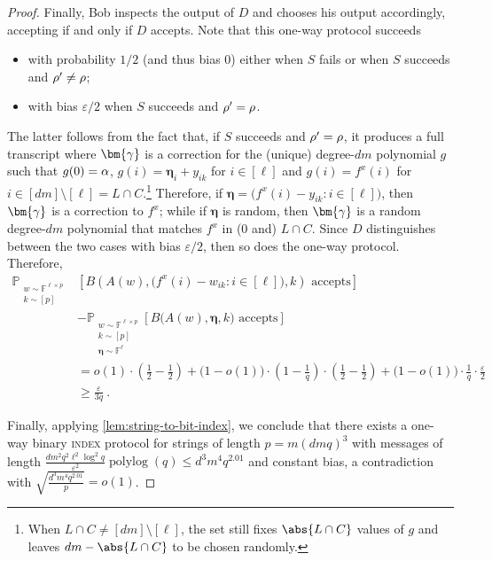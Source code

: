 \documentclass[a4paper,UKenglish,cleveref, autoref, thm-restate]{lipics-v2021}
\theoremstyle{definition}
\newcommand{\field}{\mathbb{F}}
\renewcommand{\P}{\mathbb P}
\newcommand{\polylog}{\operatorname{polylog}}
\newcommand{\eps}{\varepsilon}
\newcommand{\indexproblem}{\normalfont\textsc{index}\xspace}
\newcommand{\pcommitlength}{p}
\newcommand{\pcommitstring}{y}
\newcommand{\dimension}{m}
\newcommand{\degree}{d}
\newcommand{\fieldsize}{q}
\renewcommand{\line}{L}
\def\fe#1{
    \ifnum#1=1
        \alpha
    \else
    \ifnum#1=2
        \beta
    \else
    \ifnum#1=3
        \gamma
    \fi\fi\fi
}
\def\rfe#1{
    \ifnum#1=1
        \rho
    \else
    \ifnum#1=2
        \sigma
    \else
    \fi\fi
}
\begin{document}
\begin{proof}
    Finally, Bob inspects the output of $D$ and chooses his output accordingly, accepting if and only if $D$ accepts. Note that this one-way protocol succeeds
    \begin{itemize}[noitemsep]
        \item with probability $1/2$ (and thus bias $0$) either when $S$ fails or when $S$ succeeds and $\rfe1' \neq \rfe1$;
        \item with bias $\eps/2$ when $S$ succeeds and $\rfe1' = \rfe1$.
    \end{itemize}
    
    The latter follows from the fact that, if $S$ succeeds and $\rfe1' = \rfe1$, it produces a full transcript where $\bm{\fe3}$ is a correction for the (unique) degree-$\degree\dimension$ polynomial $g$ such that $g(0) = \fe1$, $g(i) = \bm{\eta}_i + \pcommitstring_{ik}$ for $i \in [\ell]$ and $g(i) = f^x(i)$ for $i \in [\degree\dimension] \setminus [\ell] = \line \cap C$.\footnote{When $\line \cap C \neq [\degree\dimension] \setminus [\ell]$, the set still fixes $\abs{\line \cap C}$ values of $g$ and leaves $\degree\dimension - \abs{\line \cap C}$ to be chosen randomly.} Therefore, if $\bm{\eta} = \big(f^x(i) - \pcommitstring_{ik} : i \in [\ell]\big)$, then $\bm{\fe3}$ is a correction to $f^x$; while if $\bm{\eta}$ is random, then $\bm{\fe3}$ is a random degree-$\degree\dimension$ polynomial that matches $f^x$ in ($0$ and) $\line \cap C$. Since $D$ distinguishes between the two cases with bias $\eps/2$, then so does the one-way protocol. Therefore,
    \begin{align*}
        \P_{\substack{w \sim \field^{\ell \times \pcommitlength}\\k \sim [\pcommitlength]}}&\left[B\left(A(w), \big(f^x(i) - w_{ik} : i \in [\ell]\big), k\right)\text{ accepts}\right]\\
        &- \P_{\substack{w \sim \field^{\ell \times \pcommitlength}\\k \sim [\pcommitlength]\\\bm{\eta} \sim \field^\ell}}\left[B\big(A(w), \bm{\eta}, k\big)\text{ accepts}\right]\\
        &= o(1) \cdot \left(\frac12 - \frac12\right) + \big(1 - o(1)\big) \cdot \left(1 - \frac1 \fieldsize\right) \cdot \left(\frac12 - \frac12\right) + \big(1 - o(1)\big) \cdot \frac1 \fieldsize \cdot \frac{\eps}{2}\\
        &\geq \frac{\eps}{3\fieldsize}~.
    \end{align*}
    
    Finally, applying \cref{lem:string-to-bit-index}, we conclude that there exists a one-way binary \indexproblem protocol for strings of length $\pcommitlength = \dimension(\degree \dimension \fieldsize)^3$ with messages of length $\frac{\degree\dimension^2 \fieldsize^2 \ell^2 \log^2 \fieldsize}{\eps^2} \polylog(\fieldsize) \leq \degree^3\dimension^4\fieldsize^{2.01}$ and constant bias, a contradiction with $\sqrt{\frac{\degree^3 \dimension^4 \fieldsize^{2.01}}{\pcommitlength}} = o(1)$.
\end{proof}
\end{document}

